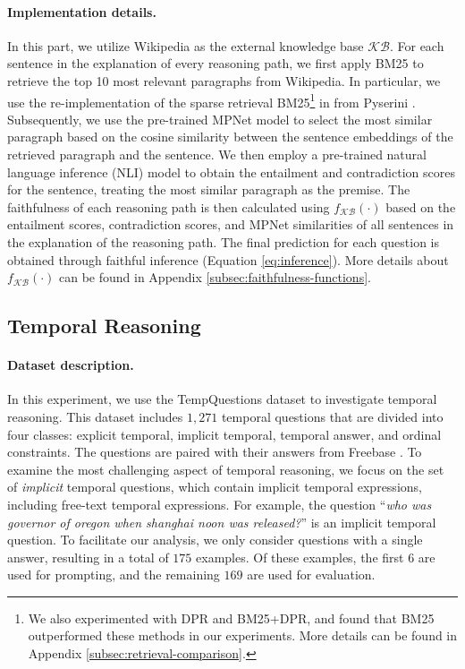 \paragraph{Implementation details.} In this part, we utilize Wikipedia as the external knowledge base $\mathcal{KB}$. For each sentence in the explanation of every reasoning path, we first apply BM25 \cite{robertson2009probabilistic} to retrieve the top 10 most relevant paragraphs from Wikipedia. In particular, we use the re-implementation of the sparse retrieval BM25\footnote{We also experimented with DPR and BM25+DPR, and found that BM25 outperformed these methods in our experiments. More details can be found in Appendix \ref{subsec:retrieval-comparison}.} in \citet{karpukhin2020dense} from Pyserini \cite{Lin_etal_SIGIR2021_Pyserini}. Subsequently, we use the pre-trained MPNet model \cite{song2020mpnet} to select the most similar paragraph based on the cosine similarity between the sentence embeddings of the retrieved paragraph and the sentence. We then employ a pre-trained natural language inference (NLI) model \cite{nie2020adversarial} to obtain the entailment and contradiction scores for the sentence, treating the most similar paragraph as the premise. The faithfulness of each reasoning path is then calculated using $f_{\mathcal{KB}}(\cdot)$ based on the entailment scores, contradiction scores, and MPNet similarities of all sentences in the explanation of the reasoning path. The final prediction for each question is obtained through faithful inference (Equation \ref{eq:inference}). More details about $f_{\mathcal{KB}}(\cdot)$ can be found in Appendix \ref{subsec:faithfulness-functions}.


\subsection{Temporal Reasoning}
\label{subsec:temporal}

\paragraph{Dataset description.} In this experiment, we use the TempQuestions dataset \cite{jia2018tempquestions} to investigate temporal reasoning. This dataset includes $1,271$ temporal questions that are divided into four classes: explicit temporal, implicit temporal, temporal answer, and ordinal constraints. The questions are paired with their answers from Freebase \cite{bollacker2008freebase}. To examine the most challenging aspect of temporal reasoning, we focus on the set of \textit{implicit} temporal questions, which contain implicit temporal expressions, including free-text temporal expressions. For example, the question ``\textit{who was governor of oregon when shanghai noon was released?}'' is an implicit temporal question. To facilitate our analysis, we only consider questions with a single answer, resulting in a total of $175$ examples. Of these examples, the first $6$ are used for prompting, and the remaining $169$ are used for evaluation.

